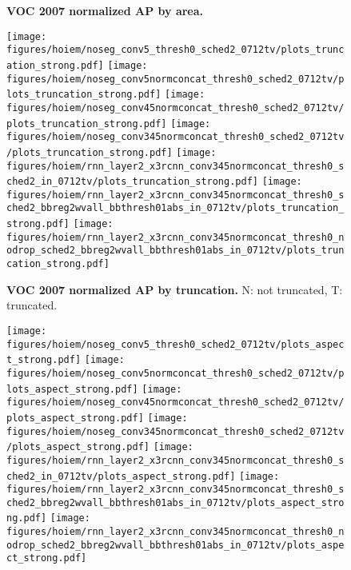 \documentclass[10pt,twocolumn,letterpaper]{article}
\begin{document}
\begin{figure}[t]
  \caption{%
    \textbf{VOC 2007 normalized AP by area.}
  }
  \label{fig:hoiem}
\end{figure}\begin{figure}[t]
  \begin{center}
   \texttt{[image: figures/hoiem/noseg\_conv5\_thresh0\_sched2\_0712tv/plots\_truncation\_strong.pdf]}
   \texttt{[image: figures/hoiem/noseg\_conv5normconcat\_thresh0\_sched2\_0712tv/plots\_truncation\_strong.pdf]}
   \texttt{[image: figures/hoiem/noseg\_conv45normconcat\_thresh0\_sched2\_0712tv/plots\_truncation\_strong.pdf]}
   \texttt{[image: figures/hoiem/noseg\_conv345normconcat\_thresh0\_sched2\_0712tv/plots\_truncation\_strong.pdf]}
   \texttt{[image: figures/hoiem/rnn\_layer2\_x3rcnn\_conv345normconcat\_thresh0\_sched2\_in\_0712tv/plots\_truncation\_strong.pdf]}
   \texttt{[image: figures/hoiem/rnn\_layer2\_x3rcnn\_conv345normconcat\_thresh0\_sched2\_bbreg2wvall\_bbthresh01abs\_in\_0712tv/plots\_truncation\_strong.pdf]}
   \texttt{[image: figures/hoiem/rnn\_layer2\_x3rcnn\_conv345normconcat\_thresh0\_nodrop\_sched2\_bbreg2wvall\_bbthresh01abs\_in\_0712tv/plots\_truncation\_strong.pdf]}
  \end{center}
  \vspace{-12pt}
  \caption{%
    \textbf{VOC 2007 normalized AP by truncation.}  N: not truncated, T: truncated.
  }
  \label{fig:hoiem}
\end{figure}\begin{figure}[t]
  \begin{center}
   \texttt{[image: figures/hoiem/noseg\_conv5\_thresh0\_sched2\_0712tv/plots\_aspect\_strong.pdf]}
   \texttt{[image: figures/hoiem/noseg\_conv5normconcat\_thresh0\_sched2\_0712tv/plots\_aspect\_strong.pdf]}
   \texttt{[image: figures/hoiem/noseg\_conv45normconcat\_thresh0\_sched2\_0712tv/plots\_aspect\_strong.pdf]}
   \texttt{[image: figures/hoiem/noseg\_conv345normconcat\_thresh0\_sched2\_0712tv/plots\_aspect\_strong.pdf]}
   \texttt{[image: figures/hoiem/rnn\_layer2\_x3rcnn\_conv345normconcat\_thresh0\_sched2\_in\_0712tv/plots\_aspect\_strong.pdf]}
   \texttt{[image: figures/hoiem/rnn\_layer2\_x3rcnn\_conv345normconcat\_thresh0\_sched2\_bbreg2wvall\_bbthresh01abs\_in\_0712tv/plots\_aspect\_strong.pdf]}
   \texttt{[image: figures/hoiem/rnn\_layer2\_x3rcnn\_conv345normconcat\_thresh0\_nodrop\_sched2\_bbreg2wvall\_bbthresh01abs\_in\_0712tv/plots\_aspect\_strong.pdf]}

\end{center}
\end{figure}
\end{document}

